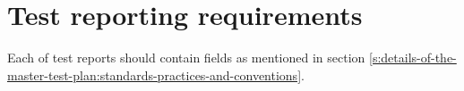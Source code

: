 \section{Test reporting requirements} \label{s:details-of-the-master-test-plan:test-reporting-requirements}
	\begin{comment}
		$<$ Specify the purpose, content, format, recipients, and timing of all test reports. Test reporting consists of Test Logs (Clause 13), Anomaly Reports (Clause 14), Level Interim Test Status Report(s) (Clause 15), Level Test Report(s) (Clause 16), and the Master Test Report (Clause 17). Test reporting may also include optional reports defined by the user of this standard. The format and grouping of the optional reports are user defined and will vary according to subject matter. $>$
	\end{comment}
	Each of test reports should contain fields as mentioned in section \ref{s:details-of-the-master-test-plan:standards-practices-and-conventions}. 
